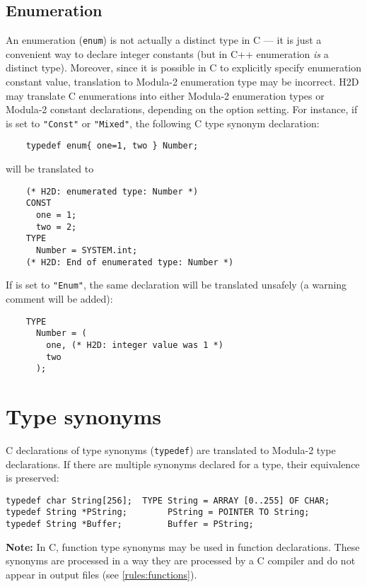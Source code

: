\subsection{Enumeration}
\label{rules:types:enum}

An enumeration (\verb'enum') is not actually a distinct type in C ---
it is just a convenient way to declare integer constants (but in
C++ enumeration {\em is} a distinct type). Moreover, since it is
possible in C to explicitly specify enumeration constant value,
translation to Modula-2 enumeration type may be incorrect.
H2D may translate C enumerations into either Modula-2
enumeration types or Modula-2 constant declarations, depending
on the  option setting.
For instance, if  is set to \verb'"Const"' or
\verb'"Mixed"', the following C type synonym declaration:

\verb'    typedef enum{ one=1, two } Number;'

will be translated to

{\samepage
\begin{verbatim}
    (* H2D: enumerated type: Number *)
    CONST
      one = 1;
      two = 2;
    TYPE
      Number = SYSTEM.int;
    (* H2D: End of enumerated type: Number *)
\end{verbatim}
} %

If  is set to \verb'"Enum"', the same
declaration will be translated unsafely (a warning comment will be added):

\begin{verbatim}
    TYPE
      Number = (
        one, (* H2D: integer value was 1 *)
        two
      );
\end{verbatim}

\section{Type synonyms}
\label{rules:typedef}

C declarations of type synonyms ({\tt typedef}) are translated to Modula-2 type
declarations. If there are multiple synonyms declared for a type, their
equivalence is preserved:

\begin{verbatim}
typedef char String[256];  TYPE String = ARRAY [0..255] OF CHAR;
typedef String *PString;        PString = POINTER TO String;
typedef String *Buffer;         Buffer = PString;
\end{verbatim}

{\bf Note:} In C, function type synonyms may be used in function
declarations. These synonyms are processed in a way they are
processed by a C compiler and do not appear in output files
(see \ref{rules:functions}).

